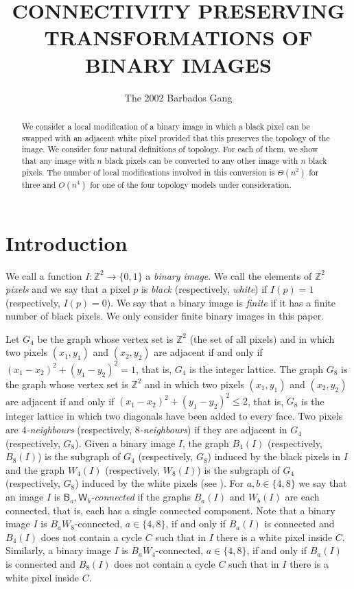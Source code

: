 \documentclass[lotsofwhite,charterfonts]{patmorin}
\title{\MakeUppercase{Connectivity Preserving Transformations 
	of Binary Images}}
\author{The 2002 Barbados Gang}
\date{}
\newcommand{\Z}{\mathbb{Z}}
\begin{document}
\maketitle

\begin{abstract} 
We consider a local modification of a binary image
in which a black pixel can be swapped with an adjacent white pixel
provided that this preserves the topology of the image. We consider four natural definitions of topology. For each of them, we show that any image with $n$ black pixels can be converted to any other image with $n$ black pixels. The number of local modifications involved in this conversion is $\Theta(n^2)$ for three and $O(n^4)$ for one of the four topology models under consideration.
\end{abstract}

\section{Introduction}

We call a function $I:\Z^2\rightarrow\{0,1\}$ a \emph{binary image}.
We call the elements of $\Z^2$ \emph{pixels} and we say that a pixel
$p$ is \emph{black} (respectively, \emph{white}) if $I(p)=1$
(respectively, $I(p)=0$).  We say that a binary image is \emph{finite} if it
has a finite number of black pixels. We only consider finite binary images in this paper. 

Let $G_4$ be the graph whose vertex set is $\Z^2$ (the set of all
pixels) and in which two pixels $(x_1,y_1)$ and $(x_2,y_2)$ are
adjacent if and only if $(x_1-x_2)^2+(y_1-y_2)^2=1$, that is, $G_4$ is the integer lattice.  The graph $G_8$ is the graph whose vertex set is $\Z^2$ and
in which two pixels $(x_1,y_1)$ and $(x_2,y_2)$ are adjacent if and only if
$(x_1-x_2)^2+(y_1-y_2)^2\le 2$, that is, $G_8$ is the integer lattice in
which two diagonals have been added to every face. Two pixels are \emph{$4$-neighbours} (respectively, \emph{$8$-neighbours}) if they are adjacent in $G_4$  (respectively, $G_8$). Given a binary image $I$, the graph $B_4(I)$ (respectively, $B_8(I)$) is the subgraph of $G_4$ (respectively, $G_8$) induced by the black pixels in $I$ and the graph $W_4(I)$ (respectively, $W_8(I)$) is the subgraph of $G_4$ (respectively, $G_8$) induced by the white pixels (see ). For $a,b\in\{4,8\}$ we say that an image $I$ is \emph{$\textsf{B}_a,\textsf{W}_b$-connected} if the graphs $B_a(I)$ and $W_b(I)$ are each connected, that is, each has a single connected component. Note that a binary image $I$ is $B_aW_8$-connected, $a\in\{4,8\}$, if and only if $B_a(I)$ is connected and $B_4(I)$ does not contain a cycle $C$ such that in $I$ there is a white pixel inside $C$. Similarly, a binary image $I$ is $B_aW_4$-connected, $a\in\{4,8\}$, if and only if $B_a(I)$ is connected and $B_8(I)$ does not contain a cycle $C$ such that in $I$ there is a white pixel inside $C$. 
\end{document}
